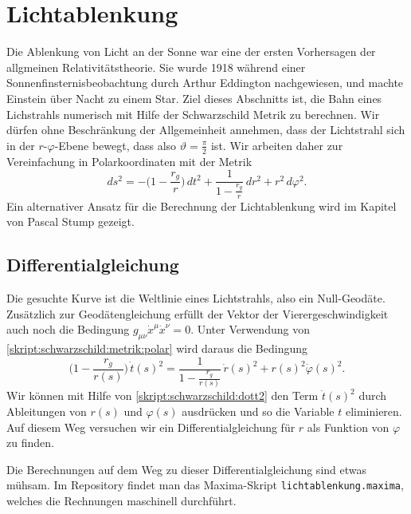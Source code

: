 %
%
%
\section{Lichtablenkung}
Die Ablenkung von Licht an der Sonne war eine der ersten Vorhersagen der
allgmeinen Relativitätstheorie.
Sie wurde 1918 während einer Sonnenfinsternisbeobachtung durch
Arthur Eddington nachgewiesen, und machte Einstein über Nacht zu einem Star.
Ziel dieses Abschnitts ist, die Bahn eines Lichstrahls numerisch
mit Hilfe der Schwarzschild Metrik zu berechnen.
Wir dürfen ohne Beschränkung der Allgemeinheit annehmen, dass der Lichtstrahl
sich in der $r$-$\varphi$-Ebene bewegt, dass also $\vartheta=\frac\pi2$ ist.
Wir arbeiten daher zur Vereinfachung in Polarkoordinaten mit der Metrik
\begin{equation}
ds^2
=
-\biggl(1-\frac{r_g}{r}\biggr)\,dt^2
+ \frac{1}{\displaystyle 1-\frac{r_g}{r}}\,dr^2
+ r^2\,d\varphi^2.
\label{skript:schwarzschild:metrik:polar}
\end{equation}
Ein alternativer Ansatz für die Berechnung der Lichtablenkung wird im
Kapitel~\label{chapter:cluster} von Pascal Stump gezeigt.

\subsection{Differentialgleichung}
Die gesuchte Kurve ist die Weltlinie eines Lichtstrahls, also ein Null-Geodäte. 
Zusätzlich zur Geodätengleichung erfüllt der Vektor der Vierergeschwindigkeit
auch noch die Bedingung $g_{\mu\nu}\dot x^\mu \dot x^\nu=0$.
Unter Verwendung von \eqref{skript:schwarzschild:metrik:polar}
wird daraus die Bedingung
\begin{equation}
\biggl(1-\frac{r_g}{r(s)}\biggr)\,\dot t(s)^2
=
\frac{1}{\displaystyle 1-\frac{r_g}{r(s)}}\,\dot r(s)^2
+ r(s)^2\dot \varphi(s)^2.
\label{skript:schwarzschild:dott2}
\end{equation}
Wir können mit Hilfe von \eqref{skript:schwarzschild:dott2}
den Term $\dot t(s)^2$ durch Ableitungen von $r(s)$ und $\varphi(s)$
ausdrücken und so die Variable $t$ eliminieren.
Auf diesem Weg versuchen wir ein Differentialgleichung für $r$
als Funktion von $\varphi$ zu finden.

Die Berechnungen auf dem Weg zu dieser Differentialgleichung sind
etwas mühsam.
Im Repository findet man das Maxima-Skript \texttt{lichtablenkung.maxima},
welches die Rechnungen maschinell durchführt.

